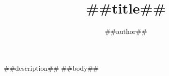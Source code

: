 \documentclass[twoside,a5paper,11pt]{book}
\title{##title##}
\author{##author##}
\date{}
\begin{document}
\maketitle
##description##
\tableofcontents
\newpage
##body##
\end{document}
